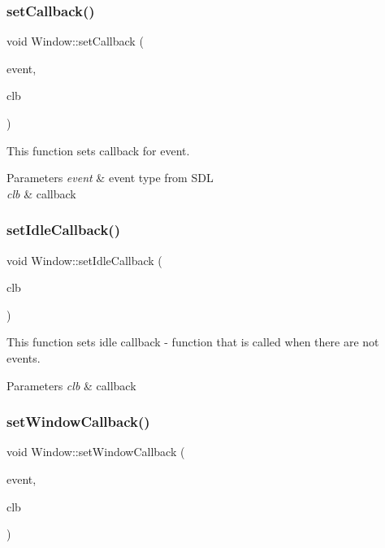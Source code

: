 \subsubsection{\texorpdfstring{set\+Callback()}{setCallback()}}
{\footnotesize\ttfamily void Window\+::set\+Callback (\begin{DoxyParamCaption}\item[{uint32\+\_\+t}]{event,  }\item[{\hyperlink{classWindow_a0e7a1332f3c35705eeed4d7b1a568d61}{Event\+Callback} const \&}]{clb }\end{DoxyParamCaption})}



This function sets callback for event. 


\begin{DoxyParams}{Parameters}
{\em event} & event type from S\+DL \\
\hline
{\em clb} & callback \\
\hline
\end{DoxyParams}
\mbox{\label{classWindow_ac1cd27329e92882a1527eece8aa4bef4}} 
\subsubsection{\texorpdfstring{set\+Idle\+Callback()}{setIdleCallback()}}
{\footnotesize\ttfamily void Window\+::set\+Idle\+Callback (\begin{DoxyParamCaption}\item[{\hyperlink{classWindow_ae666e38583ffdec789fdfc85d6504d73}{Idle\+Callback} const \&}]{clb }\end{DoxyParamCaption})}



This function sets idle callback -\/ function that is called when there are not events. 


\begin{DoxyParams}{Parameters}
{\em clb} & callback \\
\hline
\end{DoxyParams}
\mbox{\label{classWindow_a4cc4f07c386516c8607bfc7559319112}} 
\subsubsection{\texorpdfstring{set\+Window\+Callback()}{setWindowCallback()}}
{\footnotesize\ttfamily void Window\+::set\+Window\+Callback (\begin{DoxyParamCaption}\item[{uint32\+\_\+t}]{event,  }\item[{\hyperlink{classWindow_a0e7a1332f3c35705eeed4d7b1a568d61}{Event\+Callback} const \&}]{clb }\end{DoxyParamCaption})}



